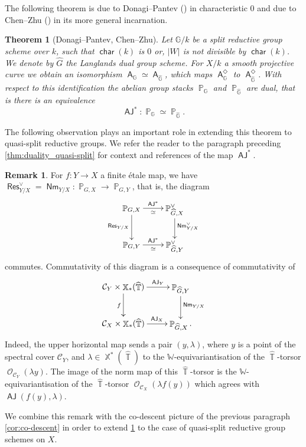 \documentclass{article}
\DeclareMathOperator{\A}{\mathsf{A}}
\newcommand{\Cc}{\mathcal{C}}
\newcommand{\Gb}{\mathbb{G}}
\DeclareMathOperator{\Pb}{\mathbb{P}}
\DeclareMathOperator{\Xb}{\mathbb{X}}
\DeclareMathOperator{\Tb}{\mathbb{T}}
\DeclareMathOperator{\Oo}{\mathcal{O}}
\DeclareMathOperator{\Res}{\mathsf{Res}}
\DeclareMathOperator{\Nm}{\mathsf{Nm}}
\DeclareMathOperator{\charac}{\mathsf{char}}
\DeclareMathOperator{\AJ}{\mathsf{AJ}}
\theoremstyle{definition}
\newtheorem{rmk}[definition]{Remark}
\theoremstyle{plain}
\newtheorem{theorem}[definition]{Theorem}
\begin{document}
The following theorem is due to Donagi--Pantev (\cite[Theorem A]{MR2957305}) in characteristic $0$ and due to Chen--Zhu (\cite[Theorem 1.2.1]{chenzhu}) in its more general incarnation.

\begin{theorem}[Donagi--Pantev, Chen--Zhu]\label{thm:duality}
Let $\Gb/k$ be a split reductive group scheme over $k$, such that $\charac(k)$ is $0$ or, $|W|$ is not divisible by $\charac(k)$. We denote by $\widehat{G}$ the Langlands dual group scheme. For $X/k$ a smooth projective curve we obtain an isomorphism $\A_{\Gb} \simeq \A_{\widehat{\Gb}}$, which maps $\A_{\Gb}^{\Diamond}$ to $\A_{\widehat{\Gb}}^{\Diamond}$. With respect to this identification the abelian group stacks $\Pb_{\Gb}$ and $\Pb_{\widehat{\Gb}}$ are dual, that is there is an equivalence
$$\AJ^*\colon \Pb_{\Gb} \simeq \Pb_{\widehat{\Gb}}.$$
\end{theorem}

The following observation plays an important role in extending this theorem to quasi-split reductive groups. We refer the reader to the paragraph preceding \ref{thm:duality_quasi-split} for context and references of the map $\AJ^*$.

\begin{rmk}\label{rmk:dual}
For $f\colon Y \to X$ a finite \'etale map, we have $\Res_{Y/X}^{\vee} = \Nm_{Y/X}\colon \Pb_{G,X}\to \Pb_{G,Y}$, that is, the diagram
\[
\xymatrix{
\Pb_{G,X} \ar[d]_{\Res_{Y/X}} \ar[r]^-{\AJ^*}_{\simeq} & \Pb_{\widehat{G},X}^{\vee} \ar[d]^{\Nm_{Y/X}^{\vee}} \\
\Pb_{G,Y} \ar[r]^-{\AJ^*}_{\simeq} & \Pb_{\widehat{G},Y}^{\vee}
}
\]
commutes. Commutativity of this diagram is a consequence of commutativity of 
\[
\xymatrix{
\Cc_Y \times \Xb_*(\widehat{\Tb}) \ar[r]^-{\AJ_Y} \ar[d]_f & \Pb_{\widehat{G},Y} \ar[d]^{\Nm_{Y/X}} \\
\Cc_X \times \Xb_*(\widehat{\Tb}) \ar[r]^-{\AJ_X} & \Pb_{\widehat{G},X}.
}
\]
Indeed, the upper horizontal map sends a pair $(y,\lambda)$, where $y$ is a point of the spectral cover $\Cc_Y$, and $\lambda \in \Xb^*(\widehat{\Tb})$ to the $\mathbb{W}$-equivariantisation of the $\widehat{\Tb}$-torsor $\Oo_{\Cc_Y}(\lambda y)$. The image of the norm map of this $\widehat{\Tb}$-torsor is the $\mathbb{W}$-equivariantisation of the $\widehat{\Tb}$-torsor $\Oo_{\Cc_X}(\lambda f(y))$ which agrees with $\AJ(f(y),\lambda)$.
\end{rmk}

We combine this remark with the co-descent picture of the previous paragraph \ref{cor:co-descent} in order to extend \ref{thm:duality} to the case of quasi-split reductive group schemes on $X$.
\end{document}
